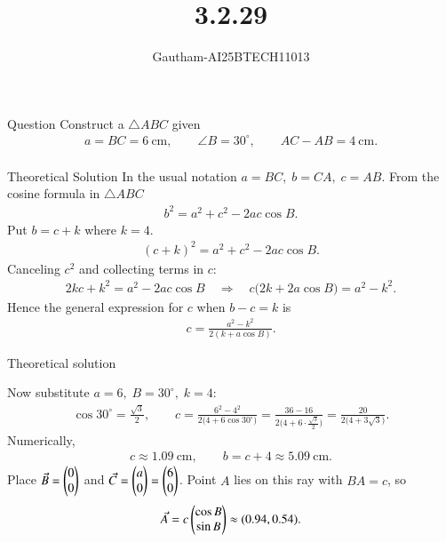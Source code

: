 \documentclass{beamer}
\title %
{3.2.29}
\author %
{Gautham-AI25BTECH11013}
\begin{document}
\frame{\titlepage}
\begin{frame}{Question}
Construct a $\triangle ABC$ given 
\begin{align}
a = BC = 6\ \text{cm},\qquad \angle B = 30^\circ,\qquad AC - AB = 4\ \text{cm}.\\
\end{align}
\end{frame}

\begin{frame}{Theoretical Solution}
In the usual notation $a=BC,\; b=CA,\; c=AB$.  From the cosine formula in $\triangle ABC$\\
\begin{align}
b^2 = a^2 + c^2 - 2ac\cos B. 
\end{align}
Put $b = c + k$ where $k = 4$. 
\begin{align}
(c+k)^2 = a^2 + c^2 - 2ac\cos B.
\end{align}
Canceling $c^2$ and collecting terms in $c$:
\begin{align}
2kc + k^2 = a^2 - 2ac\cos B
\quad\Longrightarrow\quad
c\big(2k + 2a\cos B\big) = a^2 - k^2.
\end{align}
       Hence the general expression for $c$ when $b-c=k$ is
\begin{align}
\boxed{ c =\frac{a^2 - k^2}{2(k + a\cos B)} }. 
\end{align} 
\end{frame}
\begin{frame}{Theoretical solution}

Now substitute $a=6,\; B=30^\circ,\; k=4$:
\begin{align}
\cos 30^\circ = \frac{\sqrt3}{2},\qquad
c = \frac{6^2 - 4^2}{2\big(4 + 6\cos 30^\circ\big)}
= \frac{36 - 16}{2\big(4 + 6\cdot\frac{\sqrt3}{2}\big)}
= \frac{20}{2\big(4 + 3\sqrt3\big)}.
\end{align}
Numerically,
\begin{align}
c \approx 1.09\ \text{cm},\qquad b = c + 4 \approx 5.09\ \text{cm}.
\end{align}
Place $\Vec{B}=\begin{pmatrix}0 \\ 0\end{pmatrix}$ and $\Vec{C}=\begin{pmatrix}a \\ 0\end{pmatrix}=\begin{pmatrix}6 \\ 0\end{pmatrix}$.
Point $A$ lies on this ray with $BA=c$, so
\begin{align}
\Vec{A}=c\begin{pmatrix}\cos B \\ \sin B\end{pmatrix}
\approx (0.94, 0.54).
\end{align}
\end{frame}
\end{document}
